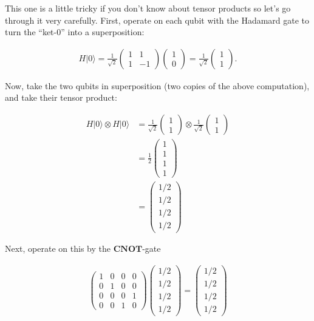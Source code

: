 \documentclass[11pt]{article}
\begin{document}
    This one is a little tricky if you don't know about tensor products so
let's go through it very carefully. First, operate on each qubit with
the Hadamard gate to turn the ``ket-\(0\)'' into a superposition:

\begin{align}
H |0\rangle = \frac{1}{\sqrt{2}}\begin{pmatrix} 1&1 \\ 1&-1\end{pmatrix}\begin{pmatrix}1\\0\end{pmatrix}  = \frac{1}{\sqrt{2}} \begin{pmatrix} 1\\1 \end{pmatrix}.
\end{align}

    Now, take the two qubits in superposition (two copies of the above
computation), and take their tensor product:

\begin{align}
    H|0\rangle \otimes H|0\rangle &= \frac{1}{\sqrt{2}}\begin{pmatrix} 1\\1 \end{pmatrix} \otimes \frac{1}{\sqrt{2}} \begin{pmatrix} 1\\1 \end{pmatrix}\\ 
    &= \frac{1}{2}\begin{pmatrix} 1\\1\\1\\1 \end{pmatrix}\\
    &= \begin{pmatrix} 1/2\\1/2\\1/2\\1/2 \end{pmatrix}
\end{align}

    Next, operate on this by the \(\mathbf{CNOT}\)-gate

\begin{align}
\begin{pmatrix} 1 & 0 & 0 & 0\\ 0 & 1 & 0 & 0 \\ 0 & 0 & 0 & 1\\ 0 & 0 & 1 & 0 \end{pmatrix} \begin{pmatrix} 1/2\\1/2\\1/2\\1/2 \end{pmatrix} = 
\begin{pmatrix} 1/2\\1/2\\1/2\\1/2 \end{pmatrix}
\end{align}
\end{document}
